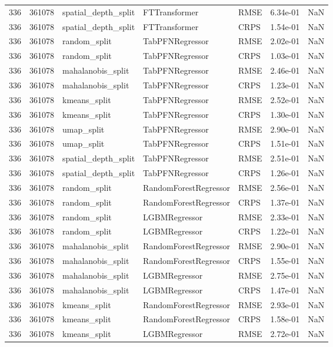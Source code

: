 \begin{tabular}{rrlllrr}
336 & 361078 & spatial\_depth\_split & FTTransformer & RMSE & 6.34e-01 & NaN \\
336 & 361078 & spatial\_depth\_split & FTTransformer & CRPS & 1.54e-01 & NaN \\
336 & 361078 & random\_split & TabPFNRegressor & RMSE & 2.02e-01 & NaN \\
336 & 361078 & random\_split & TabPFNRegressor & CRPS & 1.03e-01 & NaN \\
336 & 361078 & mahalanobis\_split & TabPFNRegressor & RMSE & 2.46e-01 & NaN \\
336 & 361078 & mahalanobis\_split & TabPFNRegressor & CRPS & 1.23e-01 & NaN \\
336 & 361078 & kmeans\_split & TabPFNRegressor & RMSE & 2.52e-01 & NaN \\
336 & 361078 & kmeans\_split & TabPFNRegressor & CRPS & 1.30e-01 & NaN \\
336 & 361078 & umap\_split & TabPFNRegressor & RMSE & 2.90e-01 & NaN \\
336 & 361078 & umap\_split & TabPFNRegressor & CRPS & 1.51e-01 & NaN \\
336 & 361078 & spatial\_depth\_split & TabPFNRegressor & RMSE & 2.51e-01 & NaN \\
336 & 361078 & spatial\_depth\_split & TabPFNRegressor & CRPS & 1.26e-01 & NaN \\
336 & 361078 & random\_split & RandomForestRegressor & RMSE & 2.56e-01 & NaN \\
336 & 361078 & random\_split & RandomForestRegressor & CRPS & 1.37e-01 & NaN \\
336 & 361078 & random\_split & LGBMRegressor & RMSE & 2.33e-01 & NaN \\
336 & 361078 & random\_split & LGBMRegressor & CRPS & 1.22e-01 & NaN \\
336 & 361078 & mahalanobis\_split & RandomForestRegressor & RMSE & 2.90e-01 & NaN \\
336 & 361078 & mahalanobis\_split & RandomForestRegressor & CRPS & 1.55e-01 & NaN \\
336 & 361078 & mahalanobis\_split & LGBMRegressor & RMSE & 2.75e-01 & NaN \\
336 & 361078 & mahalanobis\_split & LGBMRegressor & CRPS & 1.47e-01 & NaN \\
336 & 361078 & kmeans\_split & RandomForestRegressor & RMSE & 2.93e-01 & NaN \\
336 & 361078 & kmeans\_split & RandomForestRegressor & CRPS & 1.58e-01 & NaN \\
336 & 361078 & kmeans\_split & LGBMRegressor & RMSE & 2.72e-01 & NaN \\

\end{tabular}
